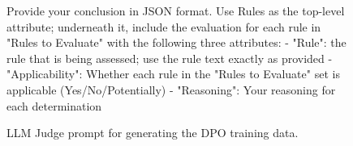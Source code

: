 \begin{figure}[htbp]
\begin{tcolorbox}[colback=orange!5!white,colframe=orange!75!black,title=LLM Judge Prompt for Generating the DPO Training Data]
Provide your conclusion in JSON format. Use Rules as the top-level attribute; underneath it, include the evaluation for each rule in "Rules to Evaluate" with the following three attributes:\newline
- "Rule": the rule that is being assessed; use the rule text exactly as provided\newline
- "Applicability": Whether each rule in the "Rules to Evaluate" set is applicable (Yes/No/Potentially)\newline
- "Reasoning": Your reasoning for each determination\newline
\end{tcolorbox}
\caption{LLM Judge prompt for generating the DPO training data.}
\label{figure:prompt_dpo}
\end{figure}
